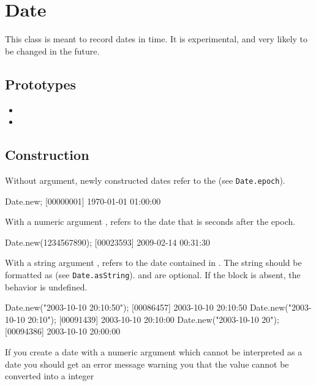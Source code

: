 \section{Date}

This class is meant to record dates in time.  It is experimental, and
very likely to be changed in the future.

\subsection{Prototypes}
\begin{itemize}
\item {}
\item {}
\end{itemize}

\subsection{Construction}

Without argument, newly constructed dates refer to the 
(see \lstinline|Date.epoch|).

\begin{urbiscript}
Date.new;
[00000001] 1970-01-01 01:00:00
\end{urbiscript}

With a numeric argument , refers to the date that is 
seconds after the epoch.

\begin{urbiscript}[firstnumber=last]
Date.new(1234567890);
[00023593] 2009-02-14 00:31:30
\end{urbiscript}

With a string argument , refers to the date contained in .
The string should be formatted as  (see \lstinline|Date.asString|). 
and  are optional. If the block 
is absent, the behavior is undefined.


\begin{urbiscript}[firstnumber=last]
Date.new("2003-10-10 20:10:50");
[00086457] 2003-10-10 20:10:50
Date.new("2003-10-10 20:10");
[00091439] 2003-10-10 20:10:00
Date.new("2003-10-10 20");
[00094386] 2003-10-10 20:00:00
\end{urbiscript}

If you create a date with a numeric argument which cannot be interpreted as
a date you should get an error message warning you that the value cannot be
converted into a integer

